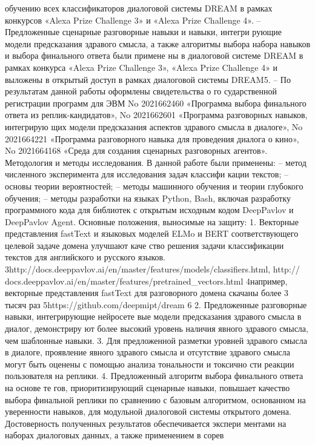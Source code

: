 обучению всех классификаторов диалоговой системы DREAM
в рамках конкурсов «Alexa Prize Challenge 3» и «Alexa Prize
Challenge 4».
– Предложенные сценарные разговорные навыки и навыки, интегри
рующие модели предсказания здравого смысла, а также алгоритмы
выбора набора навыков и выбора финального ответа были примене
ны в диалоговой системе DREAM в рамках конкурса «Alexa Prize
Challenge 3», «Alexa Prize Challenge 4» и выложены в открытый
доступ в рамках диалоговой системы DREAM5.
– По результатам данной работы оформлены свидетельства о го
сударственной регистрации программ для ЭВМ No 2021662460
«Программа выбора финального ответа из реплик-кандидатов»,
No 2021662601 «Программа разговорных навыков, интегрирую
щих модели предсказания аспектов здравого смысла в диалоге»,
No 2021664221 «Программа разговорного навыка для проведения
диалога о кино», No 2021664168 «Среда для создания сценарных
разговорных агентов».
Методология и методы исследования. В данной работе были
применены:
– метод численного эксперимента для исследования задач классифи
кации текстов;
– основы теории вероятностей;
– методы машинного обучения и теории глубокого обучения;
– методы разработки на языках Python, Bash, включая разработку
программного кода для библиотек с открытым исходным кодом
DeepPavlov и DeepPavlov Agent.
Основные положения, выносимые на защиту:
1. Векторные представления fastText и языковых моделей ELMo и
BERT соответствующего целевой задаче домена улучшают каче
ство решения задачи классификации текстов для английского и
русского языков.
3http://docs.deeppavlov.ai/en/master/features/models/classifiers.html, http://
docs.deeppavlov.ai/en/master/features/pretrained_vectors.html
4например, векторные представления fastText для разговорного домена скачаны
более 3 тысяч раз
5https://github.com/deepmipt/dream
6
2. Предложенные разговорные навыки, интегрирующие нейросете
вые модели предсказания здравого смысла в диалог, демонстриру
ют более высокий уровень наличия явного здравого смысла, чем
шаблонные навыки.
3. Для предложенной разметки уровней здравого смысла в диалоге,
проявление явного здравого смысла и отсутствие здравого смысла
могут быть оценены с помощью анализа тональности и токсично
сти реакции пользователя на реплики.
4. Предложенный алгоритм выбора финального ответа на основе те
гов, приоритизирующий сценарные навыки, повышает качество
выбора финальной реплики по сравнению с базовым алгоритмом,
основанном на уверенности навыков, для модульной диалоговой
системы открытого домена.
Достоверность полученных результатов обеспечивается экспери
ментами на наборах диалоговых данных, а также применением в сорев
